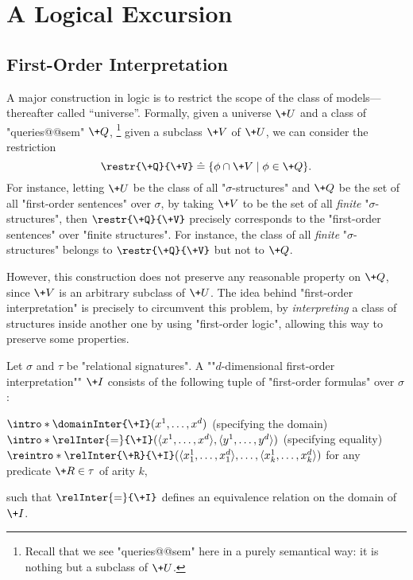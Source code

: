 \section{A Logical Excursion}
\label{sec:preliminaries-automatic-structures-logic}

\subsection{First-Order Interpretation}

A major construction in logic is to restrict the scope of the class
of models---thereafter called ``universe''.
Formally, given a universe $\+U$ and a class of "queries@@sem" $\+Q$,%
\footnote{Recall that we see "queries@@sem" here in a purely semantical way: it is nothing but a subclass of $\+U$.}
given a subclass $\+V$ of $\+U$, we can consider the restriction
\[
	\restr{\+Q}{\+V} \defeq \{\phi \cap \+V \mid \phi \in \+Q\}.
\]
For instance, letting $\+U$ be the class of all "$\sigma$-structures" and $\+Q$ be the set of all 
"first-order sentences" over $\sigma$, by taking $\+V$ to be the set of all \emph{finite}
"$\sigma$-structures", then $\restr{\+Q}{\+V}$ precisely corresponds to
the "first-order sentences" over "finite structures". For instance, the class of all
\emph{finite} "$\sigma$-structures" belongs to $\restr{\+Q}{\+V}$ but not to
$\+Q$.

However, this construction does not preserve any reasonable property on $\+Q$,
since $\+V$ is an arbitrary subclass of $\+U$. The idea behind "first-order interpretation"
is precisely to circumvent this problem, by \emph{interpreting} a class of structures
inside another one by using "first-order logic", allowing this way to preserve some properties.

Let $\sigma$ and $\tau$ be "relational signatures".
A \AP ""$d$-dimensional first-order interpretation"" $\+I$ consists of the following tuple of
"first-order formulas" over $\sigma$:
\begin{itemize}
	\itemAP $\intro*\domainInter{\+I}(x^1,\dotsc, x^d)$ (specifying the domain)
	\itemAP $\intro*\relInter{=}{\+I}(\tup{x^1,\dotsc, x^d}, \tup{y^1,\dotsc, y^d})$ (specifying equality)
	\itemAP $\reintro*\relInter{\+R}{\+I}(\tup{x^1_1,\dotsc,x^d_1}, \dotsc,
		\tup{x^1_k,\dotsc,x^d_k})$ for any predicate $\+R \in \tau$ of arity $k$,
\end{itemize}
such that $\relInter{=}{\+I}$ defines an equivalence relation on the domain of $\+I$.

